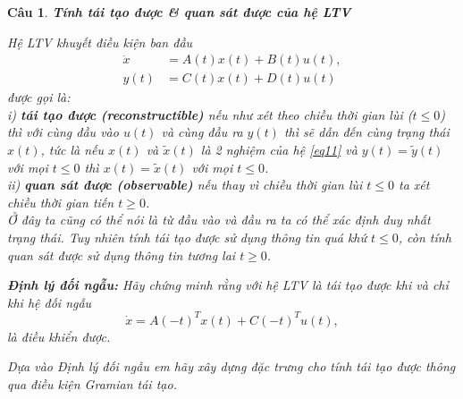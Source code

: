 \documentclass[11pt]{article}
\newtheorem{bt}{Câu}
\def\tx{\tilde{x}}
\def\ty{\tilde{y}}
\begin{document}
\begin{bt} \textbf{Tính tái tạo được \& quan sát được của hệ LTV}
	\begin{tcolorbox}[colback=yellow!2!white,colframe=green!75!blue]
		Hệ LTV khuyết điều kiện ban đầu 
		\begin{equation}\label{eq11}
			\begin{aligned}
				\dot{x} &= A(t)x(t) + B(t)u(t), \\
				y(t) &= C(t)x(t) + D(t)u(t)
			\end{aligned}
		\end{equation}
		được gọi là: \\
		i) \textbf{tái tạo được (reconstructible)} nếu như 
		xét theo chiều thời gian lùi ($t \leq 0$) thì với cùng đầu vào $u(t)$ và cùng đầu ra $y(t)$ thì sẽ dẫn đến cùng trạng thái $x(t)$, tức là nếu $x(t)$ và $\tx(t)$ là 2 nghiệm của hệ \eqref{eq11} và $y(t) = \ty(t)$ với mọi $t \leq 0$ thì $x(t) = \tx(t)$ với mọi $t \leq 0$. \\
		ii) \textbf{quan sát được (observable)} nếu thay vì chiều thời gian lùi $t\leq 0$ ta xét chiều thời gian tiến $t\geq 0$.\\ 
		{\rm Ở đây ta cũng có thể nói là từ đầu vào và đầu ra ta có thể xác định duy nhất trạng thái. Tuy nhiên tính tái tạo được sử dụng thông tin quá khứ $t \leq 0$, còn tính quan sát được sử dụng thông tin tương lai $t \geq 0$.}
	\end{tcolorbox}
	
	\begin{tcolorbox}[colback=red!5!white,colframe=green!75!black]
		\textbf{Định lý đối ngẫu:} Hãy chứng minh rằng với hệ LTV là 
		tái tạo được khi và chỉ khi hệ đối ngẫu
		\begin{equation}
			\dot{x} = A(-t)^Tx(t) + C(-t)^Tu(t), 	
		\end{equation}
		là điều khiển được.
	\end{tcolorbox}
	
	\noindent Dựa vào Định lý đối ngẫu em hãy xây dựng đặc trưng cho tính tái tạo được thông qua điều kiện Gramian tái tạo. 
\end{bt}
\end{document}
